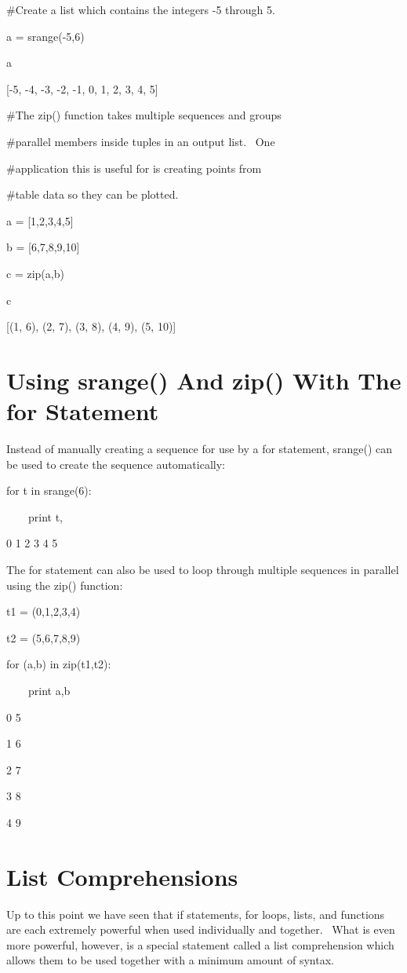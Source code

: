 \documentclass[12pt,twoside]{book}
\begin{document}
\#Create a list which contains the integers {}-5 through 5.

a = srange({}-5,6)

a

{\textbar}

[{}-5, {}-4, {}-3, {}-2, {}-1, 0, 1, 2, 3, 4, 5]

\#The zip() function takes multiple sequences and groups

\#parallel members inside tuples in an output list. \ One

\#application this is useful for is creating points from

\#table data so they can be plotted.

a = [1,2,3,4,5]

b = [6,7,8,9,10]

c = zip(a,b)

c

{\textbar}

[(1, 6), (2, 7), (3, 8), (4, 9), (5, 10)]

\section[Using srange() And zip() With The for Statement]{
Using srange() And zip() With The for Statement}

Instead of manually creating a sequence for use by a for statement,
srange() can be used to create the sequence automatically:


\bigskip

for t in srange(6):

\ \ \ \ print t,

{\textbar}

0 1 2 3 4 5


\bigskip

The for statement can also be used to loop through multiple sequences in
parallel using the zip() function:


\bigskip

t1 = (0,1,2,3,4)

t2 = (5,6,7,8,9)

for (a,b) in zip(t1,t2):

\ \ \ \ print a,b

{\textbar}

0 5

1 6

2 7

3 8

4 9

\section[List Comprehensions]{List Comprehensions}
Up to this point we have seen that if statements, for loops, lists, and
functions are each extremely powerful when used individually and
together. \ What is even more powerful, however, is a special statement
called a list comprehension which allows them to be used together with
a minimum amount of syntax.
\end{document}
